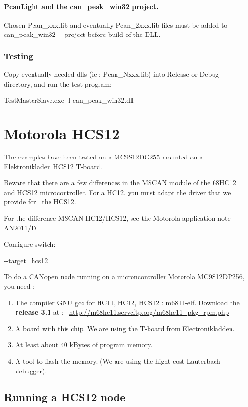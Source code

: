 \documentclass[12pt,twoside]{article}
\newcommand\liststyleLx{%
\renewcommand\labelitemi{{--}}
\renewcommand\labelitemii{{--}}
\renewcommand\labelitemiii{{--}}
\renewcommand\labelitemiv{{--}}
}
\begin{document}
\paragraph{PcanLight and the can\_peak\_win32 project.}
Chosen Pcan\_xxx.lib and eventually Pcan\_2xxx.lib files must be added
to can\_peak\_win32 \ \ project before build of the DLL.

\subsubsection{Testing}
Copy eventually needed dlls (ie : Pcan\_Nxxx.lib) into Release or Debug
directory, and run the test program:

{\ttfamily
TestMasterSlave.exe {}-l can\_peak\_win32.dll}

\section{Motorola HCS12}
The examples have been tested on a MC9S12DG255 mounted on a
Elektronikladen HCS12 T{}-board.

Beware that there are a few differences in the MSCAN module of the
68HC12 and HCS12 microcontroller. For a HC12, you must adapt the driver
that we provide for \ the HCS12.

For the difference MSCAN HC12/HCS12, see the Motorola application note
AN2011/D.

Configure switch:

{\ttfamily
 {}-{}-target=hcs12}

To do a CANopen node running on a microncontroller Motorola MC9S12DP256,
you need :

\liststyleLx
\begin{enumerate}
\item The compiler GNU gcc for HC11, HC12, HCS12 : m6811{}-elf. \newline
Download the \textbf{release 3.1} at :
\ \href{http://m68hc11.serveftp.org/m68hc11_pkg_rpm.php}{http://m68hc11.serveftp.org/m68hc11\_pkg\_rpm.php}

\item A board with this chip. We are using the T{}-board from
Electronikladden. 
\item At least about 40 kBytes of program memory.
\item A tool to flash the memory. (We are using the hight cost
Lauterbach debugger).
\end{enumerate}
\subsection{Running a HCS12 node}
\end{document}
